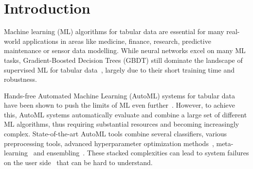 \documentclass{article}
\begin{document}
\section{Introduction}
\label{sec:introduction}
Machine learning (ML) algorithms for tabular data are essential for many real-world applications in areas like medicine, finance, research, predictive maintenance or sensor data modelling. %
%
While neural networks excel on many ML tasks, Gradient-Boosted Decision Trees (GBDT) still dominate the landscape of supervised ML for tabular data~\citep{GBDT,nnsfortabular2}, largely due to their short training time and robustness.

Hands-free Automated Machine Learning (AutoML) systems for tabular data have been shown to push the limits of ML even 
further~\citep{thornton-kdd13a,hutter-book19a,erickson-arxiv20a}. %
However, to achieve this, AutoML systems automatically evaluate and combine a large set of different ML algorithms, thus requiring substantial resources and becoming increasingly complex. %
State-of-the-art AutoML tools combine several classifiers, various preprocessing tools, advanced hyperparameter optimization methods~\citep{falkner-icml18a}, meta-learning~\citep{feurer-aaai15a,yang-kdd19a} and ensembling~\citep{escalante-jmlr09a,feurer-nips2015a,olson-gecco16a,feurer-arxiv20v2,erickson-arxiv20a}.
These stacked complexities can lead to system failures on the user side~\citep{erickson-arxiv20a} that can be hard to understand.
\end{document}
